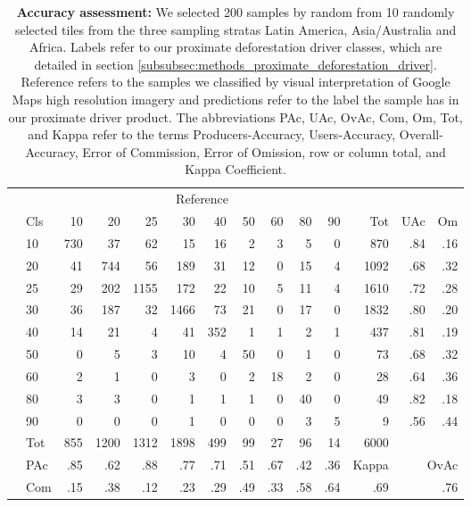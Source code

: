 			\begin{table}[ht]
				\centering
				\caption[Accuracy assessment]{\textbf{Accuracy assessment:} We selected 200 samples by random from 10 randomly selected tiles from the three sampling stratas Latin America, Asia/Australia and Africa. Labels refer to our proximate deforestation driver classes, which are detailed in section \ref{subsubsec:methods_proximate_deforestation_driver}. Reference refers to the samples we classified by visual interpretation of Google Maps high resolution imagery and predictions refer to the label the sample has in our proximate driver product. The abbreviations PAc, UAc, OvAc, Com, Om, Tot, and Kappa refer to the terms Producers-Accuracy, Users-Accuracy, Overall-Accuracy, Error of Commission, Error of Omission, row or column total, and Kappa Coefficient.}
				\label{tab:results_confusion_matrix}
				\begin{tabular}{llrrrrrrrrrrrr}
					\hline
					& & \multicolumn{9}{c}{Reference} & & & \\\cline{3-11}
					& Cls & 10 & 20 & 25 & 30 & 40 & 50 & 60 & 80 & 90 & Tot & UAc & Om \\\hline
					\multirow{9}{*}{\STAB{\rotatebox[origin=c]{90}{Prediction}}}
					& 10 & 730 & 37 & 62 & 15 & 16 & 2 & 3 & 5 & 0 & 870 & .84 & .16 \\ 
					& 20 & 41 & 744 & 56 & 189 & 31 & 12 & 0 & 15 & 4 & 1092 & .68 & .32 \\ 
					& 25 & 29 & 202 & 1155 & 172 & 22 & 10 & 5 & 11 & 4 & 1610 & .72 & .28 \\ 
					& 30 & 36 & 187 & 32 & 1466 & 73 & 21 & 0 & 17 & 0 & 1832 & .80 & .20 \\ 
					& 40 & 14 & 21 & 4 & 41 & 352 & 1 & 1 & 2 & 1 & 437 & .81 & .19 \\ 
					& 50 & 0 & 5 & 3 & 10 & 4 & 50 & 0 & 1 & 0 & 73 & .68 & .32 \\ 
					& 60 & 2 & 1 & 0 & 3 & 0 & 2 & 18 & 2 & 0 & 28 & .64 & .36 \\ 
					& 80 & 3 & 3 & 0 & 1 & 1 & 1 & 0 & 40 & 0 & 49 & .82 & .18 \\ 
					& 90 & 0 & 0 & 0 & 1 & 0 & 0 & 0 & 3 & 5 & 9 & .56 & .44 \\\hline 
					& Tot & 855 & 1200 & 1312 & 1898 & 499 & 99 & 27 & 96 & 14 & 6000 & & \\
					& PAc & .85 & .62 & .88 & .77 & .71 & .51 & .67 & .42 & .36 & Kappa & \multicolumn{2}{r}{OvAc} \\
					& Com & .15 & .38 & .12 & .23 & .29 & .49 & .33 & .58 & .64 & .69 & \multicolumn{2}{r}{.76} \\ \hline
				\end{tabular}
			\end{table}

